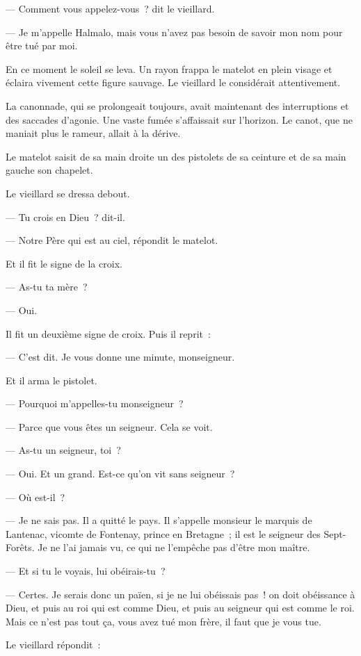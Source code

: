 \documentclass[french,twoside]{book} %
\begin{document}
— Comment vous appelez-vous ? dit le vieillard.\par
— Je m’appelle Halmalo, mais vous n’avez pas besoin de savoir mon nom pour être tué par moi.\par
En ce moment le soleil se leva. Un rayon frappa le matelot en plein visage et éclaira vivement cette figure sauvage. Le vieillard le considérait attentivement.\par
La canonnade, qui se prolongeait toujours, avait maintenant des interruptions et des saccades d’agonie.  Une vaste fumée s’affaissait sur l’horizon. Le canot, que ne maniait plus le rameur, allait à la dérive.\par
Le matelot saisit de sa main droite un des pistolets de sa ceinture et de sa main gauche son chapelet.\par
Le vieillard se dressa debout.\par
— Tu crois en Dieu ? dit-il.\par
— Notre Père qui est au ciel, répondit le matelot.\par
Et il fit le signe de la croix.\par
— As-tu ta mère ?\par
— Oui.\par
Il fit un deuxième signe de croix. Puis il reprit :\par
— C’est dit. Je vous donne une minute, monseigneur.\par
Et il arma le pistolet.\par
— Pourquoi m’appelles-tu monseigneur ?\par
— Parce que vous êtes un seigneur. Cela se voit.\par
— As-tu un seigneur, toi ?\par
— Oui. Et un grand. Est-ce qu’on vit sans seigneur ?\par
— Où est-il ?\par
— Je ne sais pas. Il a quitté le pays. Il s’appelle monsieur le marquis de Lantenac, vicomte de Fontenay, prince en Bretagne ; il est le seigneur des Sept-Forêts. Je ne l’ai jamais vu, ce qui ne l’empêche pas d’être mon maître.\par
— Et si tu le voyais, lui obéirais-tu ?\par
— Certes. Je serais donc un païen, si je ne lui obéissais pas ! on doit obéissance à Dieu, et puis au roi qui est comme Dieu, et puis au seigneur qui est comme le roi. Mais ce n’est pas tout ça, vous avez tué mon frère, il faut que je vous tue.\par
 Le vieillard répondit :\par
\end{document}
